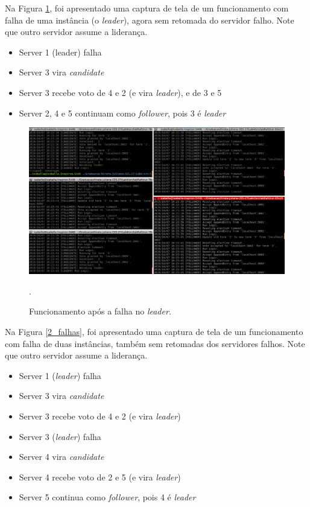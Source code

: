 \documentclass[journal,onecolumn]{IEEEtran}
\begin{document}
Na Figura \ref{1_falha}, foi apresentado uma captura de tela de um funcionamento com falha de uma instância (o \textit{leader}), agora sem retomada do servidor falho. Note que outro servidor assume a liderança.

\begin{itemize}
\item Server 1 (leader) falha
\item Server 3 vira \textit{candidate}
\item Server 3 recebe voto de 4 e 2 (e vira \textit{leader}), e de 3 e 5
\item Server 2, 4 e 5 continuam como \textit{follower}, pois 3 é \textit{leader}
\end{itemize}

\begin{figure}[H]
\centering
\centerline{\includegraphics[scale=0.4]{imagens/1_falha.png}}
\caption{Funcionamento após a falha no \textit{leader}.}.
\label{1_falha}
\end{figure}

Na Figura \ref{2_falhas}, foi apresentado uma captura de tela de um funcionamento com falha de duas instâncias, também sem retomadas dos servidores falhos. Note que outro servidor assume a liderança.

\begin{itemize}
\item Server 1 (\textit{leader}) falha
\item Server 3 vira \textit{candidate}
\item Server 3 recebe voto de 4 e 2 (e vira \textit{leader})
\item Server 3 (\textit{leader}) falha
\item Server 4 vira \textit{candidate}
\item Server 4 recebe voto de 2 e 5 (e vira \textit{leader})
\item Server 5 continua como \textit{follower}, pois 4 é \textit{leader}
\end{itemize}
\end{document}
